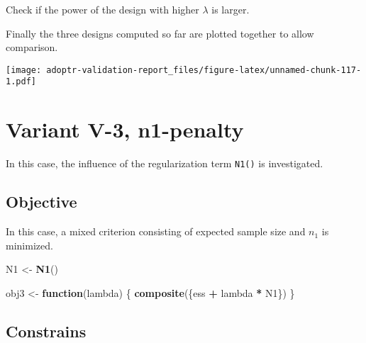 \documentclass[]{book}
\newenvironment{Shaded}{\begin{snugshade}}{\end{snugshade}}
\newcommand{\ControlFlowTok}[1]{\textcolor[rgb]{0.13,0.29,0.53}{\textbf{#1}}}
\newcommand{\DecValTok}[1]{\textcolor[rgb]{0.00,0.00,0.81}{#1}}
\newcommand{\KeywordTok}[1]{\textcolor[rgb]{0.13,0.29,0.53}{\textbf{#1}}}
\newcommand{\NormalTok}[1]{#1}
\newcommand{\OperatorTok}[1]{\textcolor[rgb]{0.81,0.36,0.00}{\textbf{#1}}}
\newcommand{\StringTok}[1]{\textcolor[rgb]{0.31,0.60,0.02}{#1}}
\begin{document}
Check if the power of the design with higher \(\lambda\) is larger.

\begin{Shaded}
\end{Shaded}

Finally the three designs computed so far are plotted together to allow
comparison.

\texttt{[image: adoptr-validation-report\_files/figure-latex/unnamed-chunk-117-1.pdf]}

\hypertarget{variantV_3}{%
\section{Variant V-3, n1-penalty}\label{variantV_3}}

In this case, the influence of the regularization term \texttt{N1()} is investigated.

\hypertarget{objective-12}{%
\subsection{Objective}\label{objective-12}}

In this case, a mixed criterion consisting of expected sample size and
\(n_1\) is minimized.

\begin{Shaded}
\begin{Highlighting}[]
\NormalTok{N1 <-}\StringTok{ }\KeywordTok{N1}\NormalTok{()}

\NormalTok{obj3 <-}\StringTok{ }\ControlFlowTok{function}\NormalTok{(lambda) \{}
  \KeywordTok{composite}\NormalTok{(\{ess }\OperatorTok{+}\StringTok{ }\NormalTok{lambda }\OperatorTok{*}\StringTok{ }\NormalTok{N1\})}
\NormalTok{\}}
\end{Highlighting}
\end{Shaded}

\hypertarget{constrains-12}{%
\subsection{Constrains}\label{constrains-12}}
\end{document}
